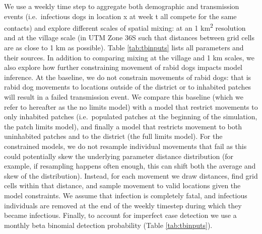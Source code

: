 \documentclass[
  oneside]{book}
\begin{document}
We use a weekly time step to aggregate both demographic and transmission events (i.e.~infectious dogs in location x at week t all compete for the same contacts) and explore different scales of spatial mixing: at an 1 km\textsuperscript{2} resolution and at the village scale (in UTM Zone 36S such that distances between grid cells are as close to 1 km as possible). Table \ref{tab:tbinputs} lists all parameters and their sources. In addition to comparing mixing at the village and 1 km scales, we also explore how further constraining movement of rabid dogs impacts model inference. At the baseline, we do not constrain movements of rabid dogs: that is rabid dog movements to locations outside of the district or to inhabited patches will result in a failed transmission event. We compare this baseline (which we refer to hereafter as the no limits model) with a model that restrict movements to only inhabited patches (i.e.~populated patches at the beginning of the simulation, the patch limits model), and finally a model that restricts movement to both uninhabited patches and to the district (the full limits model). For the constrained models, we do not resample individual movements that fail as this could potentially skew the underlying parameter distance distribution (for example, if resampling happens often enough, this can shift both the average and skew of the distribution). Instead, for each movement we draw distances, find grid cells within that distance, and sample movement to valid locations given the model constraints. We assume that infection is completely fatal, and infectious individuals are removed at the end of the weekly timestep during which they became infectious. Finally, to account for imperfect case detection we use a monthly beta binomial detection probability (Table \ref{tab:tbinputs}).
\end{document}
